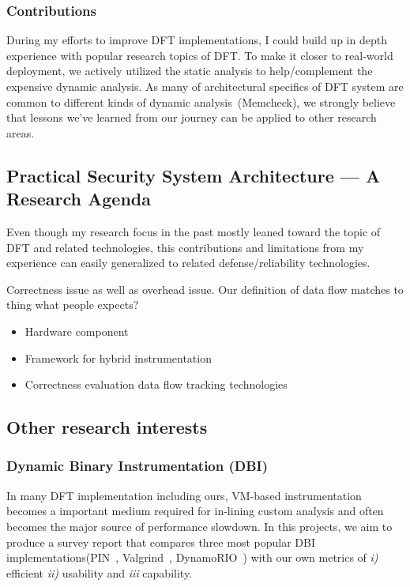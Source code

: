 \documentclass[letterpaper, 10pt]{article}
\begin{document}
\begin{small}
\subsubsection*{Contributions}
During my efforts to improve DFT implementations, I could build up in depth
experience with popular research topics of DFT. 
%
To make it closer to real-world deployment, we actively utilized the static
analysis to help/complement the expensive dynamic analysis. 
%
As many of architectural specifics of DFT system are common to different kinds
of dynamic analysis~(\ie Memcheck), we strongly believe that lessons we've
learned from our journey can be applied to other research areas.
 
\subsection*{Practical Security System Architecture --- A Research Agenda}
Even though my research focus in the past mostly leaned toward the topic of DFT
and related technologies, this contributions and limitations from my experience
can easily generalized to related defense/reliability technologies.

Correctness issue as well as overhead issue.  Our definition of data flow
matches to thing what people expects?

\begin{itemize}
 \item Hardware component
 \item Framework for hybrid instrumentation
 \item Correctness evaluation data flow tracking technologies
\end{itemize}
\end{small}

\subsection*{Other research interests} \subsubsection*{Dynamic Binary
Instrumentation (DBI)} In many DFT implementation including ours, VM-based
instrumentation becomes a important medium required for in-lining custom
analysis and often becomes the major source of performance slowdown. 
%
In this projects, we aim to produce a survey report that compares three most
popular DBI implementations(PIN~\cite{}, Valgrind~\cite{}, DynamoRIO~\cite{})
with our own metrics of {\it i)} efficient {\it ii)} usability and {\it iii}  
capability.
\end{document}
